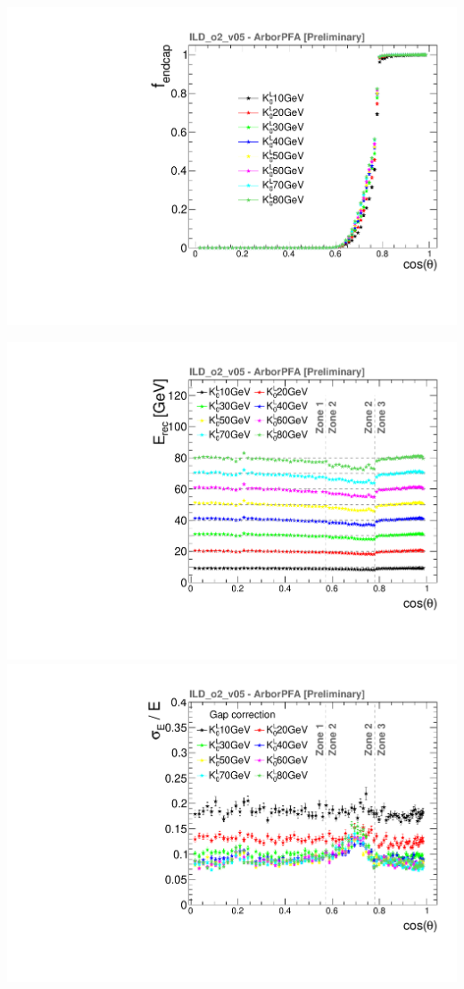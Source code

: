 \documentclass[8pt]{beamer}
\begin{document}
\begin{frame}
\begin{minipage}{0.49\linewidth}
\begin{center}
\begin{overprint}
           \centering \includegraphics[width=0.8\linewidth]{EndcapFraction_thesis.pdf}
        \end{overprint}
      \end{center}
    \end{minipage} \hfill
    \begin{minipage}{0.5\linewidth}
      \begin{center}
        \begin{overprint}
           \centering \includegraphics[width=0.8\linewidth]{ERecLinGap_nofit_thesis.pdf} \\ \includegraphics[width=0.8\linewidth]{EResLinGap_thesis.pdf}

\end{overprint}
\end{center}
\end{minipage}
\end{frame}
\end{document}
